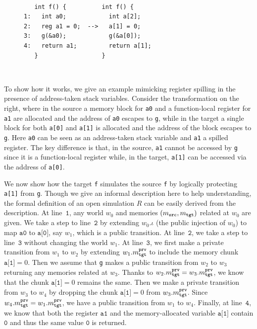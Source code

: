 {\begin{figure}
\begin{minipage}{0.45\textwidth}
\mbox{}\\[-7mm]    
\begin{Verbatim}
   int f() {          int f() {     
1:   int a0;            int a[2];   
2:   reg a1 = 0;  -->   a[1] = 0;   
3:   g(&a0);            g(&a[0]);   
4:   return a1;         return a[1];
   }                  }
\end{Verbatim}
\mbox{}\\[-10mm]
\end{minipage}
\end{figure}
To show how it works,
we give an example mimicking register spilling
in the presence of address-taken stack variables.
Consider the transformation on the right, where
in the source a memory block for \texttt{a0} and a function-local register for \texttt{a1} are allocated and
the address of \texttt{a0} escapes to \texttt{g},
while in the target a single block for both \texttt{a[0]} and \texttt{a[1]}
is allocated and the address of the block escapes to \texttt{g}.
Here \texttt{a0} can be seen as an address-taken stack variable and \texttt{a1} a spilled register.
The key difference is that, in the source, \texttt{a1} cannot be accessed by
\texttt{g} since it is a function-local register
while, in the target, \texttt{a[1]} can be accessed via the address of \texttt{a[0]}.

We now show how the target \texttt{f} simulates the source \texttt{f}
by logically protecting \texttt{a[1]} from \texttt{g}.
Though we give an informal description here to help understanding,
the formal definition of an open simulation $R$ 
can be easily derived from the description.
At line~$\texttt{1}$, any world $w_0$ and
memories $(m_{\texttt{src}}, m_{\texttt{tgt}})$ related at $w_0$ are given. We take a step
to line~$\texttt{2}$ by extending $w_0.\iota$ (\ie the public
injection of $w_0$) to map $\texttt{a0}$ to $\texttt{a[0]}$, say $w_1$,
which is a public transition. At line~$\texttt{2}$, we take a step
to line~$\texttt{3}$ without changing the world $w_1$.
At line~$\texttt{3}$, we first make a private transition from $w_1$
to $w_2$ by extending $w_1.m^{\texttt{prv}}_{\texttt{tgt}}$
to include the memory chunk $\texttt{a[1]} = 0$.
Then we assume that \texttt{g} makes a public transition from $w_2$ to $w_3$
returning any memories related at $w_3$. Thanks to $w_2.m^{\texttt{prv}}_{\texttt{tgt}} = w_3.m^{\texttt{prv}}_{\texttt{tgt}}$,
we know that the chunk $\texttt{a[1]} = 0$ remains the same.
Then we make a private transition from $w_3$ to $w_4$ by
dropping the chunk $\texttt{a[1]} = 0$ from $w_3.m^{\texttt{prv}}_{\texttt{tgt}}$.
Since $w_4.m^{\texttt{prv}}_{\texttt{tgt}} = w_1.m^{\texttt{prv}}_{\texttt{tgt}}$, we have a public transition from $w_1$ to $w_4$.
Finally, at line~$\texttt{4}$, we know that both the register $\texttt{a1}$ and
the memory-allocated variable $\texttt{a[1]}$ contain
$\texttt{0}$ and thus the same value $\texttt{0}$ is returned.

}
